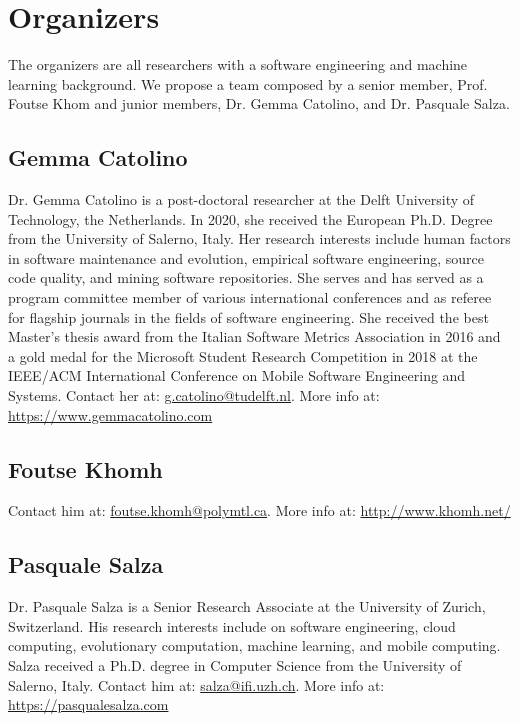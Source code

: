 
\section{Organizers}

The organizers are all researchers with a software engineering and machine learning background.
We propose a team composed by a senior member, \ie Prof. Foutse Khom and junior members, \ie Dr. Gemma Catolino, and Dr. Pasquale Salza.

\label{sec:organizers}
\subsection{Gemma Catolino}
Dr. Gemma Catolino is a post-doctoral researcher at the Delft University of Technology, the Netherlands.
In 2020, she received the European Ph.D. Degree from the University of Salerno, Italy.
Her research interests include human factors in software maintenance and evolution, empirical software engineering, source code quality, and mining software repositories.
She serves and has served as a program committee member of various international conferences and as referee for flagship journals in the fields of software engineering.
She received the best Master's thesis award from the Italian Software Metrics Association in 2016 and a gold medal for the Microsoft Student Research Competition in 2018 at the IEEE/ACM International Conference on Mobile Software Engineering and Systems.
Contact her at: \href{mailto:g.catolino@tudelft.nl}{g.catolino@tudelft.nl}.
More info at: \url{https://www.gemmacatolino.com}

\subsection{Foutse Khomh}
Contact him at: \href{mailto:foutse.khomh@polymtl.ca}{foutse.khomh@polymtl.ca}.
More info at: \url{http://www.khomh.net/}

\subsection{Pasquale Salza}
Dr. Pasquale Salza is a Senior Research Associate at the University of Zurich, Switzerland.
His research interests include on software engineering, cloud computing, evolutionary computation, machine learning, and mobile computing.
Salza received a Ph.D. degree in Computer Science from the University of Salerno, Italy.
Contact him at: \href{mailto:salza@ifi.uzh.ch}{salza@ifi.uzh.ch}.
More info at: \url{https://pasqualesalza.com}
